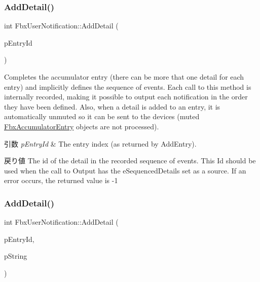 \subsubsection{\texorpdfstring{Add\+Detail()}{AddDetail()}\hspace{0.1cm}{\footnotesize\ttfamily [1/3]}}
{\footnotesize\ttfamily int Fbx\+User\+Notification\+::\+Add\+Detail (\begin{DoxyParamCaption}\item[{int}]{p\+Entry\+Id }\end{DoxyParamCaption})}

Completes the accumulator entry (there can be more that one detail for each entry) and implicitly defines the sequence of events. Each call to this method is internally recorded, making it possible to output each notification in the order they have been defined. Also, when a detail is added to an entry, it is automatically unmuted so it can be sent to the devices (muted \hyperlink{class_fbx_accumulator_entry}{Fbx\+Accumulator\+Entry} objects are not processed). 
\begin{DoxyParams}{引数}
{\em p\+Entry\+Id} & The entry index (as returned by Add\+Entry). \\
\hline
\end{DoxyParams}
\begin{DoxyReturn}{戻り値}
The id of the detail in the recorded sequence of events. This Id should be used when the call to Output has the e\+Sequenced\+Details set as a source. If an error occurs, the returned value is -\/1 
\end{DoxyReturn}
\mbox{\label{class_fbx_user_notification_a3b675ae36a5f91c34f80edd417e1bec9}} 
\subsubsection{\texorpdfstring{Add\+Detail()}{AddDetail()}\hspace{0.1cm}{\footnotesize\ttfamily [2/3]}}
{\footnotesize\ttfamily int Fbx\+User\+Notification\+::\+Add\+Detail (\begin{DoxyParamCaption}\item[{int}]{p\+Entry\+Id,  }\item[{\hyperlink{class_fbx_string}{Fbx\+String}}]{p\+String }\end{DoxyParamCaption})}

